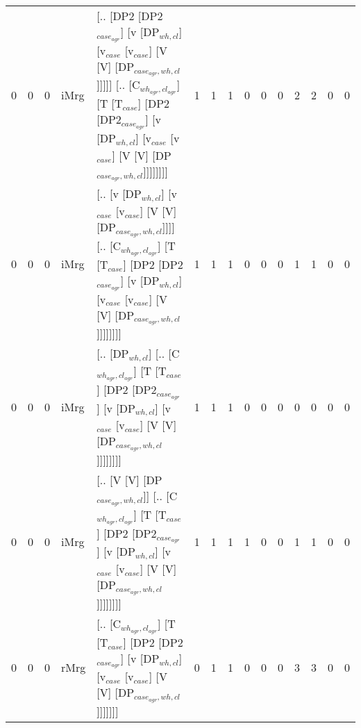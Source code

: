 \begin{tabularx}{\linewidth}{rrrlXrrrrrrrrrr}
   0 &       0 &   0 & iMrg & [.. [DP2 [DP2$_{case_{agr}}$] [v [DP$_{wh,cl}$] [v$_{case}$ [v$_{case}$] [V [V] [DP$_{case_{agr},wh,cl}$]]]]] [.. [C$_{wh_{agr},cl_{agr}}$] [T [T$_{case}$] [DP2 [DP2$_{case_{agr}}$] [v [DP$_{wh,cl}$] [v$_{case}$ [v$_{case}$] [V [V] [DP$_{case_{agr},wh,cl}$]]]]]]]]              &            1 &             1 &             1 &                  0 &                0 &                0 &           2 &           2 &              0 &              0 \\
   0 &       0 &   0 & iMrg & [.. [v [DP$_{wh,cl}$] [v$_{case}$ [v$_{case}$] [V [V] [DP$_{case_{agr},wh,cl}$]]]] [.. [C$_{wh_{agr},cl_{agr}}$] [T [T$_{case}$] [DP2 [DP2$_{case_{agr}}$] [v [DP$_{wh,cl}$] [v$_{case}$ [v$_{case}$] [V [V] [DP$_{case_{agr},wh,cl}$]]]]]]]]                                   &            1 &             1 &             1 &                  0 &                0 &                0 &           1 &           1 &              0 &              0 \\
   0 &       0 &   0 & iMrg & [.. [DP$_{wh,cl}$] [.. [C$_{wh_{agr},cl_{agr}}$] [T [T$_{case}$] [DP2 [DP2$_{case_{agr}}$] [v [DP$_{wh,cl}$] [v$_{case}$ [v$_{case}$] [V [V] [DP$_{case_{agr},wh,cl}$]]]]]]]]                                                                                     &            1 &             1 &             1 &                  0 &                0 &                0 &           0 &           0 &              0 &              0 \\
   0 &       0 &   0 & iMrg & [.. [V [V] [DP$_{case_{agr},wh,cl}$]] [.. [C$_{wh_{agr},cl_{agr}}$] [T [T$_{case}$] [DP2 [DP2$_{case_{agr}}$] [v [DP$_{wh,cl}$] [v$_{case}$ [v$_{case}$] [V [V] [DP$_{case_{agr},wh,cl}$]]]]]]]]                                                                    &            1 &             1 &             1 &                  1 &                0 &                0 &           1 &           1 &              0 &              0 \\
   0 &       0 &   0 & rMrg & [.. [C$_{wh_{agr},cl_{agr}}$] [T [T$_{case}$] [DP2 [DP2$_{case_{agr}}$] [v [DP$_{wh,cl}$] [v$_{case}$ [v$_{case}$] [V [V] [DP$_{case_{agr},wh,cl}$]]]]]]]                                                                                                     &            0 &             1 &             1 &                  0 &                0 &                0 &           3 &           3 &              0 &              0 \\
\hline
\end{tabularx}\endgroup\\
